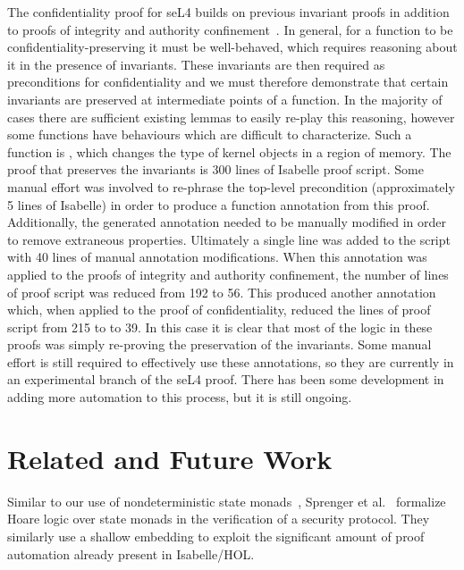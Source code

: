 \documentclass[submission]{eptcs}
\newcommand{\isafun}[1]{{\sf #1}}
\begin{document}
\begin{isabellebody}
\begin{isamarkuptext}
The confidentiality proof for seL4 builds on previous
invariant proofs in addition to proofs of integrity and
authority confinement~\cite{Sewell_WGMAK}. In general, for a function to
be confidentiality-preserving it must be well-behaved,
which requires reasoning about it in the presence of invariants.
These invariants are then required as preconditions for
confidentiality and we must therefore demonstrate that
 certain invariants are preserved at intermediate points of
a function. In the majority of cases there are sufficient
existing lemmas to easily re-play this reasoning,
however some functions have behaviours which are difficult
to characterize. Such a function is \isa{\isafun{invoke{\isaliteral{5F}{\isacharunderscore}}untyped}},
which changes the type of kernel objects in a region of memory. The proof that \isa{\isafun{invoke{\isaliteral{5F}{\isacharunderscore}}untyped}} preserves
the invariants is 300 lines of Isabelle proof script. Some manual
effort was involved to re-phrase the top-level precondition
(approximately 5 lines of Isabelle) in order to produce a function annotation from this proof. Additionally,
 the generated annotation
needed to be manually modified in order to remove
extraneous properties. Ultimately a single line was added to the script
with 40 lines of manual annotation modifications. When this annotation
was applied to the proofs of integrity and authority confinement, the
number of lines of proof script was reduced from 192 to 56. This
produced another annotation which, when applied to the proof of
confidentiality, reduced the lines of proof script from 215 to to 39. 
In this case it is clear that most of the logic in these proofs was simply re-proving the preservation of the invariants.
Some manual effort is still required to effectively use
these annotations, so they are currently in an experimental branch
of the seL4 proof. There has been some development in adding
more automation to this process, but it is still ongoing.\end{isamarkuptext}\isamarkuptrue \isadelimtheory
\endisadelimtheory
\isatagtheory
\endisatagtheory
{\isafoldtheory}\isadelimtheory
\endisadelimtheory
\end{isabellebody} 
\section{Related and Future Work}
Similar to our use of nondeterministic state
monads~\cite{Cock_KS_08}, Sprenger et al.~\cite{Sprenger_B_07} formalize Hoare logic over state monads
in the verification of a security protocol. They similarly
use a shallow embedding to exploit the significant amount
of proof automation already present in Isabelle/HOL.
\end{document}
